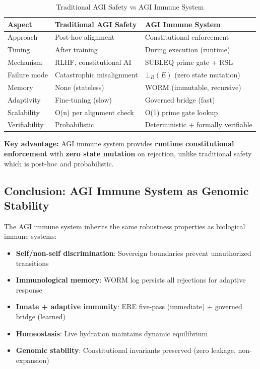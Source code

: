 \documentclass[11pt,a4paper]{article}
\begin{document}
\begin{table}[h]
\centering
\caption{Traditional AGI Safety vs AGI Immune System}
\label{tab:safety_comparison}
\begin{tabular}{@{}l l l@{}}
\toprule
\textbf{Aspect} & \textbf{Traditional AGI Safety} & \textbf{AGI Immune System} \\
\midrule
Approach & Post-hoc alignment & Constitutional enforcement \\
Timing & After training & During execution (runtime) \\
Mechanism & RLHF, constitutional AI & SUBLEQ prime gate + RSL \\
Failure mode & Catastrophic misalignment & $\bot_R(E)$ (zero state mutation) \\
Memory & None (stateless) & WORM (immutable, recursive) \\
Adaptivity & Fine-tuning (slow) & Governed bridge (fast) \\
Scalability & O(n) per alignment check & O(1) prime gate lookup \\
Verifiability & Probabilistic & Deterministic + formally verifiable \\
\bottomrule
\end{tabular}
\end{table}

\textbf{Key advantage:} AGI immune system provides \textbf{runtime constitutional enforcement} with \textbf{zero state mutation} on rejection, unlike traditional safety which is post-hoc and probabilistic.

\subsection{Conclusion: AGI Immune System as Genomic Stability}

The AGI immune system inherits the same robustness properties as biological immune systems:
\begin{itemize}
    \item \textbf{Self/non-self discrimination}: Sovereign boundaries prevent unauthorized transitions
    \item \textbf{Immunological memory}: WORM log persists all rejections for adaptive response
    \item \textbf{Innate + adaptive immunity}: ERE five-pass (immediate) + governed bridge (learned)
    \item \textbf{Homeostasis}: Live hydration maintains dynamic equilibrium
    \item \textbf{Genomic stability}: Constitutional invariants preserved (zero leakage, non-expansion)
\end{itemize}
\end{document}
